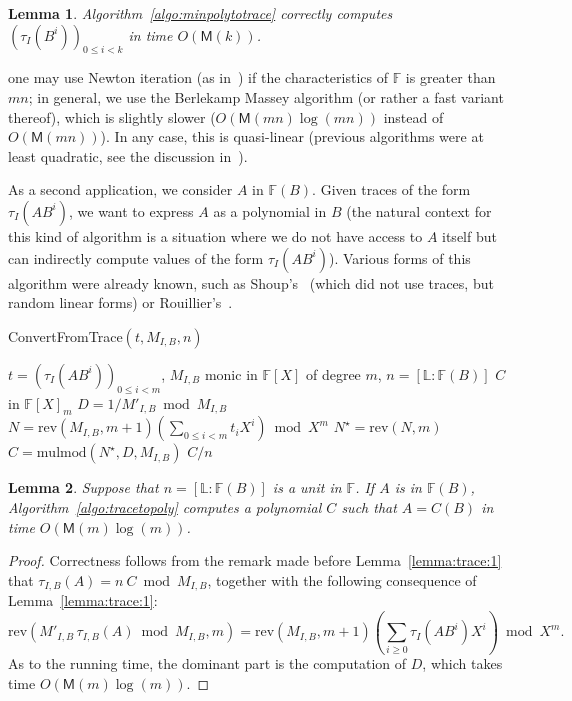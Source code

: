 \documentclass[12pt]{article}
\def\M {\ensuremath{\mathsf{M}}}
\def\F {\ensuremath{\mathbb{F}}}
\def\L {\ensuremath{\mathbb{L}}}
\def\mulmod {\ensuremath{\mathrm{mulmod}}}
\def\rev {\ensuremath{\mathrm{rev}}}
\newtheorem{Lemma}{Lemma}
\begin{document}
\begin{Lemma}\label{lemma:computetrace}
  Algorithm~\ref{algo:minpolytotrace} correctly computes
  $(\tau_I(B^i))_{0 \le i < k}$ in time $O(\M(k))$.
\end{Lemma}


 one may use Newton
iteration (as in~\cite{Schoenhage82}) if the characteristics of $\F$
is greater than $mn$; in general, we use the Berlekamp Massey
algorithm (or rather a fast variant thereof), which is slightly slower
($O(\M(mn)\log(mn))$ instead of $O(\M(mn))$). In any case, 
this is quasi-linear (previous algorithms were at least quadratic,
see the discussion in~\cite{BoFlSaSc06}).

As a second application, we consider $A$ in $\F(B)$. Given traces of
the form $\tau_I(A B^i)$, we want to express $A$ as a polynomial in
$B$ (the natural context for this kind of algorithm is a situation
where we do not have access to $A$ itself but can indirectly compute
values of the form $\tau_I(A B^i)$). Various forms of this algorithm
were already known, such as Shoup's~\cite{shoup94} (which did not use
traces, but random linear forms) or Rouillier's~\cite{rouiller99}.

\begin{algorithm}[H]
  \caption{ConvertFromTrace$(t, M_{I,B}, n)$}
  \begin{algorithmic}[1]
    \REQUIRE  $t=(\tau_I(A B^i))_{0 \le i < m}$, $M_{I,B}$ monic in $\F[X]$ of degree $m$, $n=[\L:\F(B)]$
    \ENSURE $C$ in $\F[X]_m$
    \STATE $D =  1/M'_{I,B} \bmod M_{I,B}$
    \STATE $N=\rev(M_{I,B}, m+1)( \sum_{0 \le i <m} t_i X^i) \bmod X^m$
    \STATE $N^\star = \rev(N, m)$
    \STATE $C=\mulmod(N^\star, D, M_{I,B})$
    \RETURN $C/n$
  \end{algorithmic}
  \label{algo:tracetopoly}
\end{algorithm}

\begin{Lemma}
  Suppose that $n=[\L:\F(B)]$ is a unit in $\F$. If $A$ is in
  $\F(B)$, Algorithm~\ref{algo:tracetopoly} computes a polynomial $C$
  such that $A=C(B)$ in time $O(\M(m)\log(m))$.
\end{Lemma}
\begin{proof}
  Correctness follows from the remark made before
  Lemma~\ref{lemma:trace:1} that $\tau_{I,B}(A)=n \ C \bmod M_{I,B}$,
  together with the following consequence of Lemma~\ref{lemma:trace:1}:
$$ \rev( M'_{I,B}\, \tau_{I,B}  (A) \bmod M_{I,B},m) = \rev(M_{I,B},m+1) \left (\sum_{i \ge 0} \tau_I(A B^i) X^i \right )  \bmod X^m.$$
  As to the running time, the dominant part is the computation of $D$,
  which takes time $O(\M(m)\log(m))$.
\end{proof}
\end{document}
